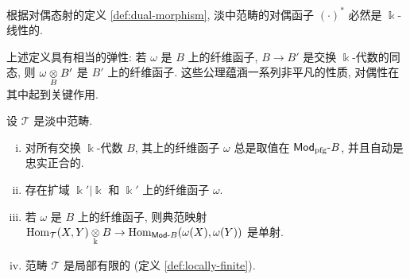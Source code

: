 根据对偶态射的定义 \ref{def:dual-morphism}, 淡中范畴的对偶函子 $(\cdot)^*$ 必然是 $\Bbbk$-线性的.

上述定义具有相当的弹性: 若 $\omega$ 是 $B$ 上的纤维函子, $B \to B'$ 是交换 $\Bbbk$-代数的同态, 则 $\omega \underset{B}{\otimes} B'$ 是 $B'$ 上的纤维函子. 这些公理蕴涵一系列非平凡的性质, 对偶性在其中起到关键作用.

\begin{lemma}\label{prop:Tannaka-generalities}
	设 $\mathcal{T}$ 是淡中范畴.
	\begin{enumerate}[(i)]
		\item 对所有交换 $\Bbbk$-代数 $B$, 其上的纤维函子 $\omega$ 总是取值在 $\mathsf{Mod}_{\mathrm{pfg}}\text{-}B$, 并且自动是忠实正合的.
		\item 存在扩域 $\Bbbk' | \Bbbk$ 和 $\Bbbk'$ 上的纤维函子 $\omega$.
		\item 若 $\omega$ 是 $B$ 上的纤维函子, 则典范映射 $\operatorname{Hom}_{\mathcal{T}}(X, Y) \underset{\Bbbk}{\otimes} B \to \operatorname{Hom}_{\mathsf{Mod}\text{-}B}(\omega(X), \omega(Y))$ 是单射.
		\item 范畴 $\mathcal{T}$ 是局部有限的 (定义 \ref{def:locally-finite}).
	\end{enumerate}
\end{lemma}
